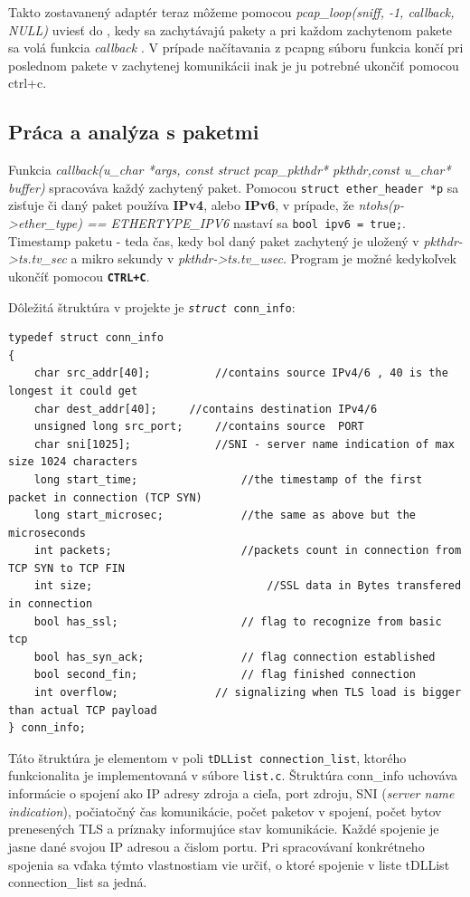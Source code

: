 \documentclass[11pt, a4paper]{article}
\begin{document}
	Takto zostavanený adaptér teraz môžeme pomocou \emph{pcap\_loop(sniff,  -1, callback, NULL)} uviesť do , kedy sa zachytávajú pakety a pri každom zachytenom pakete sa volá funkcia \emph{callback} \cite{Geeksniffer}. V prípade načítavania z pcapng súboru funkcia končí pri poslednom pakete v zachytenej komunikácii inak je ju potrebné ukončiť pomocou ctrl+c.
	
	\subsection{Práca a analýza s paketmi} 
	
	Funkcia \emph{callback(u\_char *args, const struct pcap\_pkthdr* pkthdr,const u\_char* buffer)} spracováva každý zachytený paket. Pomocou \texttt{struct ether\_header *p} sa zisťuje či daný paket používa \textbf{IPv4}, alebo \textbf{IPv6}, v prípade, že \emph{ntohs(p->ether\_type) == ETHERTYPE\_IPV6} nastaví sa \texttt{bool ipv6 = true;}. Timestamp paketu - teda čas, kedy bol daný paket zachytený je uložený v \emph{pkthdr->ts.tv\_sec} a mikro sekundy v \emph{pkthdr->ts.tv\_usec}. Program je možné kedykoľvek ukončíť pomocou \texttt{\textbf{CTRL+C}}. 
	
	Dôležitá štruktúra v projekte je \texttt{\emph{struct} conn\_info}:
	\begin{lstlisting}
typedef struct conn_info
{
    char src_addr[40];			//contains source IPv4/6 , 40 is the longest it could get 
    char dest_addr[40];		//contains destination IPv4/6  
    unsigned long src_port;		//contains source  PORT
    char sni[1025];        		//SNI - server name indication of max size 1024 characters
    long start_time;        		//the timestamp of the first packet in connection (TCP SYN)
    long start_microsec;    		//the same as above but the microseconds
    int packets;            		//packets count in connection from TCP SYN to TCP FIN
    int size;               			//SSL data in Bytes transfered in connection
    bool has_ssl;           		// flag to recognize from basic tcp
    bool has_syn_ack;       		// flag connection established
    bool second_fin;        		// flag finished connection
    int overflow;				// signalizing when TLS load is bigger than actual TCP payload
} conn_info;
	\end{lstlisting}
	
Táto štruktúra je elementom v poli \texttt{tDLList connection\_list}, ktorého funkcionalita je implementovaná v súbore \texttt{list.c}. Štruktúra conn\_info uchováva informácie o spojení ako IP adresy zdroja a cieľa, port zdroju, SNI (\emph{server name indication}), počiatočný čas komunikácie, počet paketov v spojení, počet bytov prenesených TLS a príznaky informujúce stav komunikácie. Každé spojenie je jasne dané svojou IP adresou a čislom portu. Pri spracovávaní konkrétneho spojenia sa vďaka týmto vlastnostiam vie určiť, o ktoré spojenie v liste tDLList connection\_list sa jedná.
\end{document}
